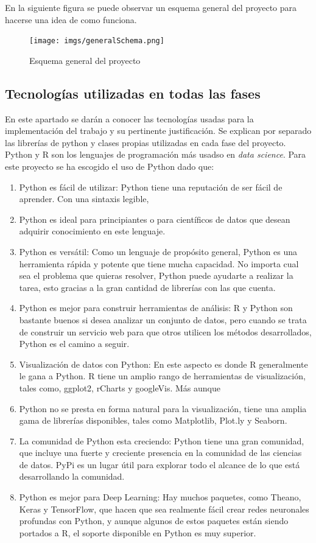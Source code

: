\documentclass[../all.tex]{subfiles}
\begin{document}
	\newpage
	En la siguiente figura se puede observar un esquema general del proyecto para hacerse una idea de como funciona.
	
	\begin{figure}[H]
		\centering
		\texttt{[image: imgs/generalSchema.png]}
		\caption{Esquema general del proyecto}
	\end{figure} 
	
\newpage
\subsection{Tecnologías utilizadas en todas las fases}
	En este apartado se darán a conocer las tecnologías usadas para la implementación del trabajo y su pertinente justificación. Se explican por separado las librerías de python y clases propias utilizadas en cada fase del proyecto.\\
	
	Python y R son los lenguajes de programación más usadso en \textit{data science}. Para este proyecto se ha escogido el uso de Python dado que\cite{RvsPython1}\cite{RvsPython2}:
	\begin{enumerate}[resume]
		\setcounter{enumi}{0}
		\item Python es fácil de utilizar:  Python tiene una reputación de ser fácil de aprender. Con una sintaxis legible, \item Python es ideal para principiantes o para científicos de datos que desean adquirir conocimiento en este lenguaje.
		\item Python es versátil: Como un lenguaje de propósito general, Python es una herramienta rápida y potente que tiene mucha capacidad. No importa cual sea el problema que quieras resolver, Python puede ayudarte a realizar la tarea, esto gracias a la gran cantidad de librerías con las que cuenta.
		\item Python es mejor para construir herramientas de análisis: R y Python son bastante buenos si desea analizar un conjunto de datos, pero cuando se trata de construir un servicio web para que otros utilicen los métodos desarrollados, Python es el camino a seguir.
		\item Visualización de datos con Python: En este aspecto es donde R generalmente le gana a Python. R tiene un amplio rango de herramientas de visualización, tales como, ggplot2, rCharts y googleVis. Más aunque \item Python no se presta en forma natural para la visualización, tiene una amplia gama de librerías disponibles, tales como Matplotlib, Plot.ly y Seaborn.
		\item La comunidad de Python esta creciendo: Python tiene una gran comunidad, que incluye una fuerte y creciente presencia en la comunidad de las ciencias de datos. PyPi es un lugar útil para explorar todo el alcance de lo que está desarrollando la comunidad.
		\item Python es mejor para Deep Learning: Hay muchos paquetes, como Theano, Keras y TensorFlow, que hacen que sea realmente fácil crear redes neuronales profundas con Python, y aunque algunos de estos paquetes están siendo portados a R, el soporte disponible en Python es muy superior.
	\end{enumerate}
	\newpage
\end{document}
